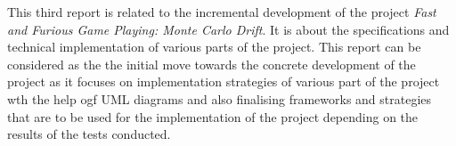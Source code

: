 This third report is related to the incremental development of the project \textit{Fast and Furious Game Playing: Monte Carlo Drift}. It is about the specifications and technical implementation of various parts  of the project.
This report can be considered as the the initial move towards the concrete development of the project as it focuses on implementation strategies of various part of the project wth the help ogf UML diagrams and also finalising frameworks and strategies that are to be used for the implementation of the project depending on the results of the tests conducted.